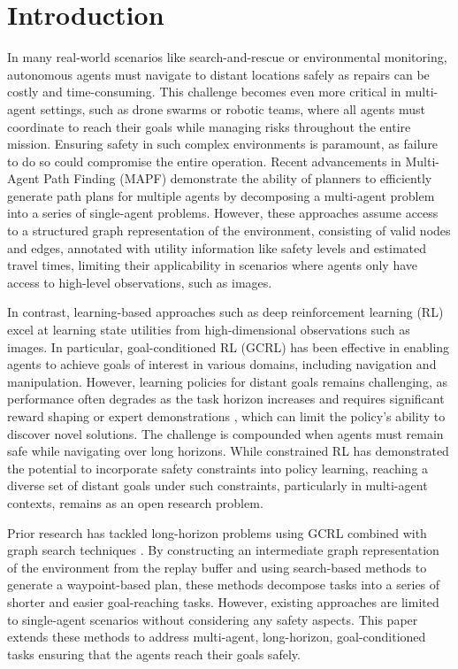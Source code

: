 \documentclass[letterpaper, 10 pt, conference]{IEEEConference}
\begin{document}
\section{Introduction}
In many real-world scenarios like search-and-rescue or environmental monitoring, autonomous agents must navigate to distant locations safely as repairs can be costly and time-consuming. This challenge becomes even more critical in multi-agent settings, such as drone swarms or robotic teams, where all agents must coordinate to reach their goals while managing risks throughout the entire mission. Ensuring safety in such complex environments is paramount, as failure to do so could compromise the entire operation. Recent advancements in Multi-Agent Path Finding (MAPF) \cite{mapf_benchmarks, yu2013structure, infomapf} demonstrate the ability of planners to efficiently generate path plans for multiple agents by decomposing a multi-agent problem into a series of single-agent problems. However, these approaches assume access to a structured graph representation of the environment, consisting of valid nodes and edges, annotated with utility information like safety levels and estimated travel times, limiting their applicability in scenarios where agents only have access to high-level observations, such as images.

In contrast, learning-based approaches such as deep reinforcement learning (RL) excel at learning state utilities from high-dimensional observations such as images. In particular, goal-conditioned RL (GCRL) \cite{mirowski2017learning, pmlr-v37-schaul15,pong2020temporaldifferencemodelsmodelfree} has been effective in enabling agents to achieve goals of interest in various domains, including navigation and manipulation. However, learning policies for distant goals remains challenging, as performance often degrades as the task horizon increases \cite{levy2019hierarchical,nachum2018dataefficient} and requires significant reward shaping \cite{chiang2019learning} or expert demonstrations \cite{lynch2019learning,nair2018overcoming}, which can limit the policy's ability to discover novel solutions. The challenge is compounded when agents must remain safe while navigating over long horizons. While constrained RL \cite{altman2021constrained} has demonstrated the potential to incorporate safety constraints into policy learning, reaching a diverse set of distant goals under such constraints, particularly in multi-agent contexts, remains as an open research problem.

Prior research has tackled long-horizon problems using GCRL combined with graph search techniques \cite{eysenbach2019search}. By constructing an intermediate graph representation of the environment from the replay buffer and using search-based methods to generate a waypoint-based plan, these methods decompose tasks into a series of shorter and easier goal-reaching tasks. However, existing approaches are limited to single-agent scenarios without considering any safety aspects. This paper extends these methods to address multi-agent, long-horizon, goal-conditioned tasks ensuring that the agents reach their goals safely.
\end{document}
